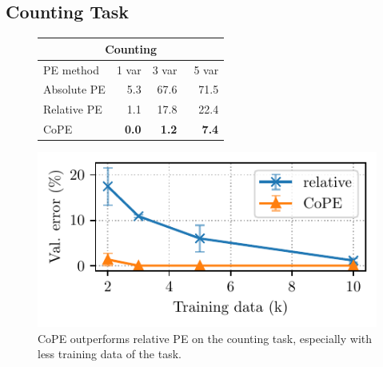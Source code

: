 \documentclass{article}
\newcommand{\ours}{CoPE\xspace}
\begin{document}
\subsection{Counting Task}



\begin{figure}[t]
\begin{minipage}{0.42\linewidth}
  \label{tab:count}
  \centering
  \begin{tabular}{lrrr}
  \multicolumn{4}{c}{Counting}\\
    \toprule
         PE method   &  1 var &  3 var & \ 5 var  \\
    \midrule
    Absolute PE & 5.3 & 67.6 & 71.5 \\
    Relative PE  & 1.1 & 17.8 & 22.4 \\
    \ours & {\bf 0.0} & {\bf 1.2} & {\bf 7.4}\\
    \bottomrule
  \end{tabular}
\end{minipage}\hfill
\begin{minipage}{0.56\linewidth}
  \centering
  \includegraphics[scale=0.8]{figs/count_train_size.pdf}
  \vspace{-3mm}
  \caption{\ours{} outperforms relative PE on the counting task, especially with less  training data of the task.}
  \label{fig:count}
\end{minipage}\hfill
\end{figure}
\end{document}
